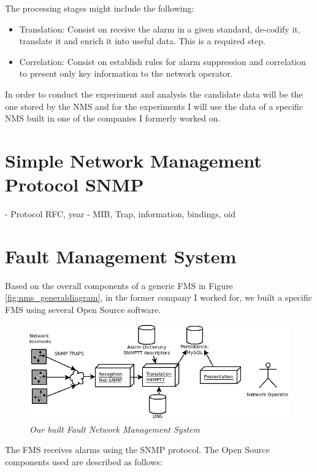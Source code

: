 \documentclass[10pt,a4paper]{report}
\begin{document}
The processing stages might include the following:

\begin{itemize}
\item Translation: Consist on receive the alarm in a given standard, de-codify it, translate it and enrich it into useful data. This is a required step.

\item Correlation: Consist on establish rules for alarm suppression and correlation to present only key information to the network operator.
\end{itemize}

In order to conduct the experiment and analysis the candidate data will be the one stored by the NMS and for the experiments I will use the data of a specific  NMS built in one of the  companies I formerly worked on.

\chapter{Simple Network Management Protocol SNMP}
- Protocol RFC, year
- MIB, Trap, information, bindings, oid

\chapter{Fault Management System}

Based on the overall components of a generic FMS in Figure \ref{fig:nms_generaldiagram}, in the former company I worked for, we built a specific FMS using several Open Source software. 

\begin{figure}[H]
 \includegraphics[scale=0.4]{ACC_FMS.png}
  \centering
  \caption{\textit{Our built Fault Network Management System}}
  \label{fig:acc_fms}
\end{figure}	


The FMS receives alarms using the SNMP protocol\cite{snmp}. The Open Source components used are described as follows:
\end{document}
